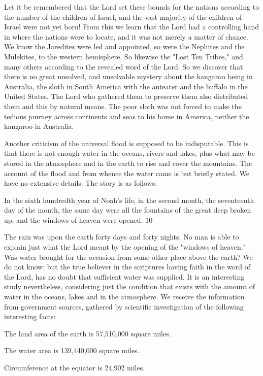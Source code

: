 Let it be remembered that the Lord set these bounds for the nations according to the number
of the children of Israel, and the vast majority of the children of Israel were not yet born!
From this we learn that the Lord had a controlling hand in where the nations were to locate,
and it was not merely a matter of chance. We know the Jaredites were led and appointed, so
were the Nephites and the Mulekites, to the western hemisphere. So likewise the "Lost Ten
Tribes," and many others according to the revealed word of the Lord. So we discover that
there is no great unsolved, and unsolvable mystery about the kangaroo being in Australia, the
sloth in South America with the anteater and the buffalo in the United States. The Lord who
gathered them to preserve them also distributed them and this by natural means. The poor
sloth was not forced to make the tedious journey across continents and seas to his home in
America, neither the kangaroo in Australia.

Another criticism of the universal flood is supposed to be indisputable. This is that there is
not enough water in the oceans, rivers and lakes, plus what may be stored in the atmosphere
and in the earth to rise and cover the mountains. The account of the flood and from whence
the water came is but briefly stated. We have no extensive details. The story is as follows:

In the sixth hundredth year of Noah's life, in the second month, the seventeenth day of the
month, the same day were all the fountains of the great deep broken up, and the windows of
heaven were opened. 10

The rain was upon the earth forty days and forty nights. No man is able to explain just what
the Lord meant by the opening of the "windows of heaven." Was water brought for the
occasion from some other place above the earth? We do not know; but the true believer in the
scriptures having faith in the word of the Lord, has no doubt that sufficient water was
supplied. It is an interesting study nevertheless, considering just the condition that exists with
the amount of water in the oceans, lakes and in the atmosphere. We receive the information
from government sources, gathered by scientific investigation of the following interesting
facts:

The land area of the earth is 57,510,000 square miles.

The water area is 139,440,000 square miles.

Circumference at the equator is 24,902 miles.

